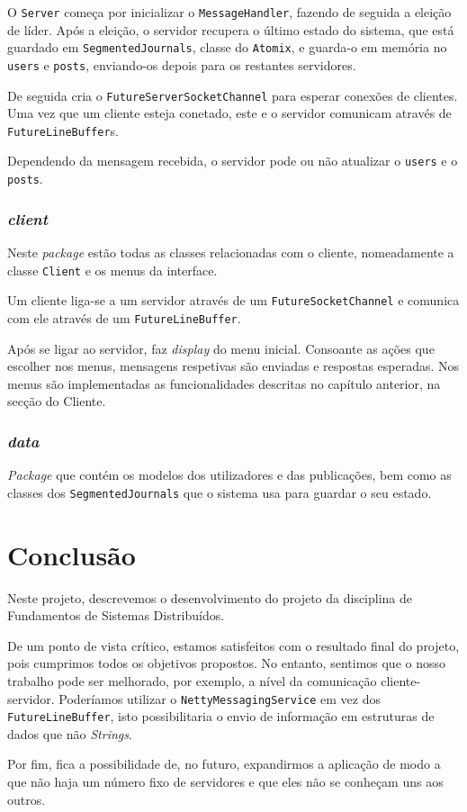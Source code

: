\documentclass[12pt, a4paper]{report}
\begin{document}
O \texttt{Server} começa por inicializar o \texttt{MessageHandler}, fazendo de seguida a eleição de líder.
Após a eleição, o servidor recupera o último estado do sistema, que está guardado em \texttt{SegmentedJournals}, classe do \texttt{Atomix}, e guarda-o em memória no \texttt{users} e \texttt{posts}, enviando-os depois para os restantes servidores.

De seguida cria o \texttt{FutureServerSocketChannel} para esperar conexões de clientes.
Uma vez que um cliente esteja conetado, este e o servidor comunicam através de \texttt{FutureLineBuffer}s.

Dependendo da mensagem recebida, o servidor pode ou não atualizar o \texttt{users} e o \texttt{posts}.



\subsection{\textit{client}}
Neste \textit{package} estão todas as classes relacionadas com o cliente, nomeadamente a classe \texttt{Client} e os menus da interface.

Um cliente liga-se a um servidor através de um \texttt{FutureSocketChannel} e comunica com ele através de um \texttt{FutureLineBuffer}.

Após se ligar ao servidor, faz \textit{display} do menu inicial.
Consoante as ações que escolher nos menus, mensagens respetivas são enviadas e respostas esperadas.
Nos menus são implementadas as funcionalidades descritas no capítulo anterior, na secção do Cliente.


\subsection{\textit{data}}
\textit{Package} que contém os modelos dos utilizadores e das publicações, bem como as classes dos \texttt{SegmentedJournals} que o sistema usa para guardar o seu estado.


\chapter{Conclusão}
Neste projeto, descrevemos o desenvolvimento do projeto da disciplina de Fundamentos de Sistemas Distribuídos.

De um ponto de vista crítico, estamos satisfeitos com o resultado final do projeto, pois cumprimos todos os objetivos propostos.
No entanto, sentimos que o nosso trabalho pode ser melhorado, por exemplo, a nível da comunicação cliente-servidor. Poderíamos utilizar o \texttt{NettyMessagingService} em vez dos \texttt{FutureLineBuffer}, isto possibilitaria o envio de informação em estruturas de dados que não \textit{Strings}.

Por fim, fica a possibilidade de, no futuro, expandirmos a aplicação de modo a que não haja um número fixo de servidores e que eles não se conheçam uns aos outros.
\end{document}
